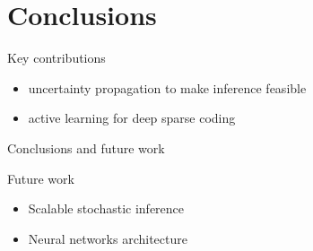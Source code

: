 \documentclass[9pt]{beamer}
\begin{document}
\section{Conclusions}
\begin{frame}{Key contributions}
  \begin{itemize}
    \item uncertainty propagation to make inference feasible
    \item active learning for deep sparse coding
  \end{itemize}

\end{frame}

\begin{frame}{Conclusions and future work}

  \begin{block}{Future work}
    \begin{itemize}
      \item Scalable stochastic inference
      \item Neural networks architecture
    \end{itemize}
  \end{block}
\end{frame}
\end{document}
